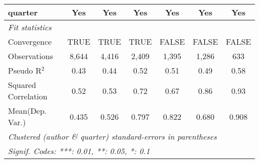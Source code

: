 \begin{tabular}{lcccccc}
   quarter                                                    & Yes          & Yes         & Yes           & Yes           & Yes          & Yes\\  
   \midrule
   \emph{Fit statistics}\\
   Convergence                                                &TRUE          & TRUE        & TRUE          & FALSE         & FALSE        & FALSE\\  
   Observations                                               & 8,644        & 4,416       & 2,409         & 1,395         & 1,286        & 633\\  
   Pseudo R$^2$                                               & 0.43         & 0.44        & 0.52          & 0.51          & 0.49         & 0.58\\  
   Squared Correlation                                        & 0.52         & 0.53        & 0.72          & 0.67          & 0.86         & 0.93\\  
Mean(Dep. Var.) & 0.435 & 0.526 & 0.797 & 0.822 & 0.680 & 0.908 \\
   \midrule \midrule
   \multicolumn{7}{l}{\emph{Clustered (author \& quarter) standard-errors in parentheses}}\\
   \multicolumn{7}{l}{\emph{Signif. Codes: ***: 0.01, **: 0.05, *: 0.1}}\\
\end{tabular}
\par\endgroup
